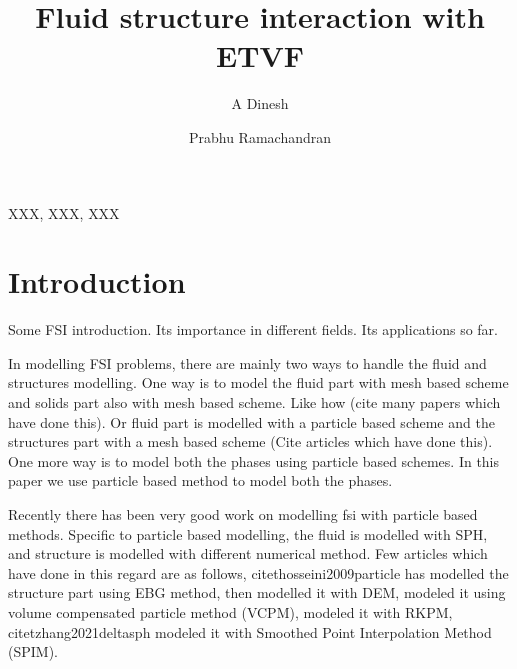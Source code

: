 \documentclass[preprint,12pt]{elsarticle}
\begin{document}
\begin{frontmatter}

  \title{Fluid structure interaction with ETVF}
  \author[IITB]{A Dinesh}
  \author[IITB]{Prabhu Ramachandran}
  \address[IITB]{Department of Aerospace Engineering, Indian Institute of
    Technology Bombay, Powai, Mumbai 400076}


\begin{abstract}
\end{abstract}

\begin{keyword}
{XXX}, {XXX}, {XXX}


\end{keyword}

\end{frontmatter}




\section{Introduction}
\label{sec:intro}

Some FSI introduction. Its importance in different fields. Its applications so
far.


In modelling FSI problems, there are mainly two ways to handle the fluid and
structures modelling. One way is to model the fluid part with mesh based
scheme and solids part also with mesh based scheme. Like how (cite many papers
which have done this). Or fluid part is modelled with a particle based scheme
and the structures part with a mesh based scheme (Cite articles which have
done this). One more way is to model both the phases using particle based
schemes. In this paper we use particle based method to model both the phases.


Recently there has been very good work on modelling fsi with particle based
methods. Specific to particle based modelling, the fluid is modelled with SPH,
and structure is modelled with different numerical method. Few articles which
have done in this regard are as follows, citet{hosseini2009particle} has
modelled the structure part using EBG method, then \citet{wu2016coupled}
modelled it with DEM, \citet{ng2020coupled} modeled it using volume
compensated particle method (VCPM), \citet{peng2021coupling} modeled it with
RKPM, citet{zhang2021deltasph} modeled it with Smoothed Point Interpolation
Method (SPIM).
\end{document}
